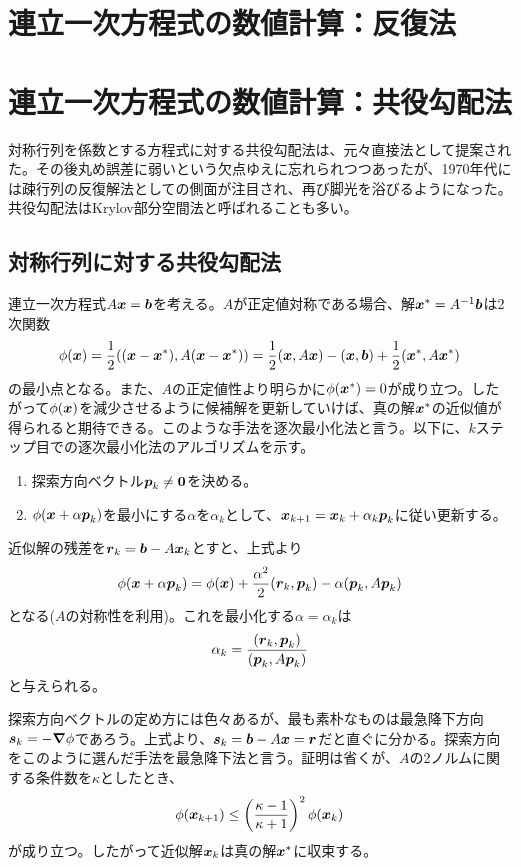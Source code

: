 \documentclass[dvipdfmx, 9pt, a4paper]{jsarticle}
\numberwithin{equation}{subsection}
\newcommand{\bm}[1]{{\mbox{\boldmath $#1$}}}
\newcommand{\bnabla}{\bm \nabla}
\begin{document}
\section{連立一次方程式の数値計算：反復法}

\section{連立一次方程式の数値計算：共役勾配法}
対称行列を係数とする方程式に対する共役勾配法は、元々直接法として提案された。その後丸め誤差に弱いという欠点ゆえに忘れられつつあったが、1970年代には疎行列の反復解法としての側面が注目され、再び脚光を浴びるようになった。共役勾配法はKrylov部分空間法と呼ばれることも多い。
\subsection{対称行列に対する共役勾配法}
連立一次方程式$A\bm x=\bm b$を考える。$A$が正定値対称である場合、解$\bm x^*=A^{-1}\bm b$は2次関数
\begin{equation}
\phi(\bm x)=\frac{1}{2}((\bm x-\bm x^*), A(\bm x-\bm x^*))=\frac{1}{2}(\bm x, A\bm x)-(\bm x, \bm b)+\frac{1}{2}(\bm x^*, A\bm x^*) \notag
\end{equation}
の最小点となる。また、$A$の正定値性より明らかに$\phi(\bm x^*)=0$が成り立つ。したがって$\phi(\bm x)$を減少させるように候補解を更新していけば、真の解$\bm x^*$の近似値が得られると期待できる。このような手法を逐次最小化法と言う。以下に、$k$ステップ目での逐次最小化法のアルゴリズムを示す。
\begin{tcolorbox}[title=逐次最小化法の$k$ステップ目]
\begin{enumerate}
\item 探索方向ベクトル$\bm p_k \neq \bm 0$を決める。
\item $\phi(\bm x+\alpha \bm p_k)$を最小にする$\alpha$を$\alpha_k$として、$\bm x_{k+1}=\bm x_k+\alpha_k\bm p_k$に従い更新する。
\end{enumerate}
\end{tcolorbox}\par
近似解の残差を$\bm r_k=\bm b-A\bm x_k$とすと、上式より
\begin{equation}
\phi(\bm x+\alpha \bm p_k)=\phi(\bm x)+\frac{\alpha^2}{2}(\bm r_k, \bm p_k)-\alpha(\bm p_k, A\bm p_k) \notag
\end{equation}
となる($A$の対称性を利用)。これを最小化する$\alpha=\alpha_k$は
\begin{equation}
\alpha_k=\frac{(\bm r_k, \bm p_k)}{(\bm p_k, A\bm p_k)}
\end{equation}
と与えられる。\par
探索方向ベクトルの定め方には色々あるが、最も素朴なものは最急降下方向$\bm s_k=-\bnabla \phi$であろう。上式より、$\bm s_k=\bm b-A\bm x=\bm r$だと直ぐに分かる。探索方向をこのように選んだ手法を最急降下法と言う。証明は省くが、$A$の2ノルムに関する条件数を$\kappa$としたとき、
\begin{equation}
\phi(\bm x_{k+1}) \leq \left(\frac{\kappa-1}{\kappa+1}\right)^2\phi(\bm x_k) \notag
\end{equation}
が成り立つ。したがって近似解$\bm x_k$は真の解$\bm x^*$に収束する。
\end{document}

